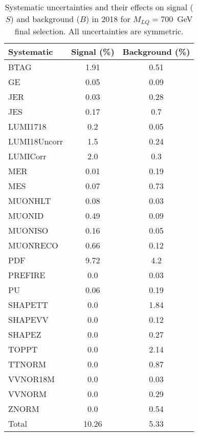 \begin{table}[htbp]
\begin{center}
\caption{Systematic uncertainties and their effects on signal ($S$) and background ($B$) in 2018 for $M_{LQ}=700$~GeV final selection. All uncertainties are symmetric.}
\begin{tabular}{lcc}
\hline\hline
Systematic & Signal (\%) & Background (\%) \\ \hline 
BTAG & 1.91 & 0.51\\ 
GE & 0.05 & 0.09\\ 
JER & 0.03 & 0.28\\ 
JES & 0.17 & 0.7\\ 
LUMI1718 & 0.2 & 0.05\\ 
LUMI18Uncorr & 1.5 & 0.24\\ 
LUMICorr & 2.0 & 0.3\\ 
MER & 0.01 & 0.19\\ 
MES & 0.07 & 0.73\\ 
MUONHLT & 0.08 & 0.03\\ 
MUONID & 0.49 & 0.09\\ 
MUONISO & 0.16 & 0.05\\ 
MUONRECO & 0.66 & 0.12\\ 
PDF & 9.72 & 4.2\\ 
PREFIRE & 0.0 & 0.03\\ 
PU & 0.06 & 0.19\\ 
SHAPETT & 0.0 & 1.84\\ 
SHAPEVV & 0.0 & 0.12\\ 
SHAPEZ & 0.0 & 0.27\\ 
TOPPT & 0.0 & 2.14\\ 
TTNORM & 0.0 & 0.87\\ 
VVNOR18M & 0.0 & 0.03\\ 
VVNORM & 0.0 & 0.29\\ 
ZNORM & 0.0 & 0.54\\ 
Total & 10.26 & 5.33\\ \hline \hline
\end{tabular}
\label{tab:SysUncertainties_uujj_700}
\end{center}
\end{table}

